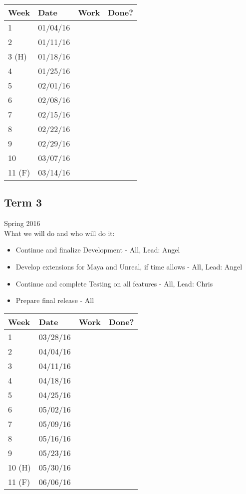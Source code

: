 \documentclass[12pt]{article}
\begin{document}
\begin{table}[H]
\centering
\begin{tabular}{|l|l|l|l|}
\hline
Week 	& Date	 		& Work	 		& 	Done?	 \\ \hline
1		& 01/04/16	 	& 		& 			 \\ \hline
2		& 01/11/16	 	& 		& 			 \\ \hline
3 (H)	& 01/18/16	 	& 		& 			 \\ \hline
4		& 01/25/16	 	& 		& 			 \\ \hline
5		& 02/01/16	 	& 		& 			 \\ \hline
6		& 02/08/16	 	& 		& 			 \\ \hline
7		& 02/15/16	 	& 		& 			 \\ \hline
8		& 02/22/16	 	& 		& 			 \\ \hline
9		& 02/29/16	 	& 		& 			 \\ \hline
10		& 03/07/16	 	& 		& 			 \\ \hline
11 (F)	& 03/14/16	 	& 		& 			 \\ \hline
\end{tabular}
\end{table}

\subsection{Term 3}
Spring 2016 \\
What we will do and who will do it:
\begin{itemize}
	\item Continue and finalize Development - All, Lead: Angel
	\item Develop extensions for Maya and Unreal, if time allows - All, Lead: Angel
	\item Continue and complete Testing on all features - All, Lead: Chris
	\item Prepare final release - All
\end{itemize}

\begin{table}[H]
\centering
\begin{tabular}{|l|l|l|l|}
\hline
Week 	& Date	 		& Work	 		& 	Done?	 \\ \hline
1		& 03/28/16	 	& 		& 			 \\ \hline
2		& 04/04/16	 	& 		& 			 \\ \hline
3		& 04/11/16	 	& 		& 			 \\ \hline
4		& 04/18/16	 	& 		& 			 \\ \hline
5		& 04/25/16	 	& 		& 			 \\ \hline
6		& 05/02/16	 	& 		& 			 \\ \hline
7		& 05/09/16	 	& 		& 			 \\ \hline
8		& 05/16/16	 	& 		& 			 \\ \hline
9		& 05/23/16	 	& 		& 			 \\ \hline
10 (H)	& 05/30/16	 	& 		& 			 \\ \hline
11 (F)	& 06/06/16	 	& 		& 			 \\ \hline
\end{tabular}
\end{table}
\end{document}
